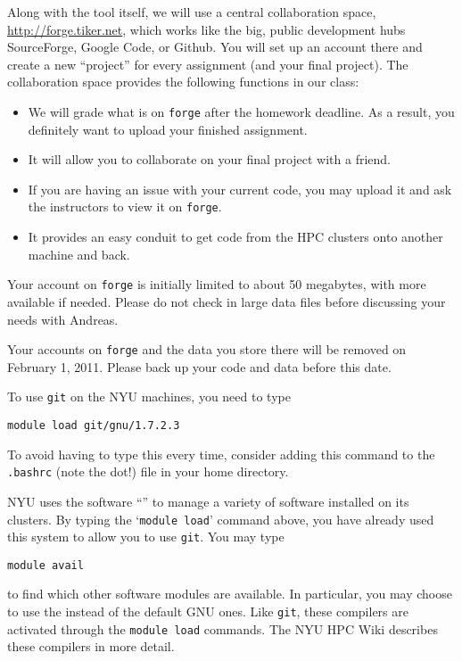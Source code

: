 \documentclass[11pt]{article}
\begin{document}
Along with the tool itself, we will use a central collaboration space,
\url{http://forge.tiker.net}, which works like the big, public
development hubs SourceForge, Google Code, or Github. You will set up
an account there and create a new ``project'' for every assignment
(and your final project). The collaboration space provides the
following functions in our class:
\begin{itemize}
  \item We will grade what is on \texttt{forge} after the homework
  deadline. As a result, you definitely want to upload your finished
  assignment.
  \item It will allow you to collaborate on your final project with a friend.
  \item If you are having an issue with your current code, you may 
  upload it and ask the instructors to view it on \texttt{forge}.
  \item It provides an easy conduit to get code from the HPC clusters
  onto another machine and back.
\end{itemize}

\begin{note}
Your account on \texttt{forge} is initially limited to
about 50 megabytes, with more available if needed. Please do not check
in large data files before discussing your needs with Andreas.

Your accounts on \texttt{forge} and the data you store there will be
removed on February 1, 2011. Please back up your code and data before
this date.
\end{note}

To use
\texttt{git} on the NYU machines, you need to type
\begin{lstlisting}
module load git/gnu/1.7.2.3
\end{lstlisting}
To avoid having to type this every time, consider adding this command
to the \texttt{.bashrc} (note the dot!) file in your home directory.

NYU uses the software ``'' to manage a variety of software installed on its clusters.
By typing the `\texttt{module load}' command above, you have already
used this system to allow you to use \texttt{git}. You may type
\begin{lstlisting}
module avail
\end{lstlisting}
to find which other software modules are available. In particular, you
may choose to use the
 instead of the default GNU ones. Like \texttt{git}, these
compilers are activated through the \texttt{module load} commands. The
NYU HPC Wiki describes these compilers in more detail.
\end{document}
